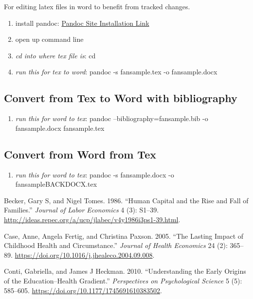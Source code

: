 \documentclass[]{article}
\begin{document}
For editing latex files in word to benefit from tracked changes.

\begin{enumerate}
\def\labelenumi{\arabic{enumi}.}
\item
  install pandoc: \href{https://pandoc.org/installing.html}{Pandoc Site
  Installation Link}
\item
  open up command line
\item
  \emph{cd into where tex file is}: cd
\item
  \emph{run this for tex to word}: pandoc -s fansample.tex -o
  fansample.docx
\end{enumerate}

\hypertarget{convert-from-tex-to-word-with-bibliography}{%
\subsection{Convert from Tex to Word with
bibliography}\label{convert-from-tex-to-word-with-bibliography}}

\begin{enumerate}
\def\labelenumi{\arabic{enumi}.}
\item
  \emph{run this for word to tex}: pandoc --bibliography=fansample.bib
  -o fansample.docx fansample.tex
\end{enumerate}

\hypertarget{convert-from-word-from-tex}{%
\subsection{Convert from Word from
Tex}\label{convert-from-word-from-tex}}

\begin{enumerate}
\def\labelenumi{\arabic{enumi}.}
\item
  \emph{run this for word to tex}: pandoc -s fansample.docx -o
  fansampleBACKDOCX.tex
\end{enumerate}

Becker, Gary S, and Nigel Tomes. 1986. ``Human Capital and the Rise and
Fall of Families.'' \emph{Journal of Labor Economics} 4 (3): S1--39.
\url{http://ideas.repec.org/a/ucp/jlabec/v4y1986i3ps1-39.html}.

Case, Anne, Angela Fertig, and Christina Paxson. 2005. ``The Lasting
Impact of Childhood Health and Circumstance.'' \emph{Journal of Health
Economics} 24 (2): 365--89.
\url{https://doi.org/10.1016/j.jhealeco.2004.09.008}.

Conti, Gabriella, and James J Heckman. 2010. ``Understanding the Early
Origins of the Education--Health Gradient.'' \emph{Perspectives on
Psychological Science} 5 (5): 585--605.
\url{https://doi.org/10.1177/1745691610383502}.
\end{document}

